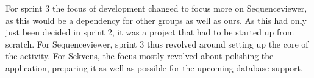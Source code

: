 For sprint 3 the focus of development changed to focus more on Sequenceviewer, as this would be a dependency for other groups as well as ours. As this had only just been decided in sprint 2, it was a project that had to be started up from scratch. For Sequenceviewer, sprint 3 thus revolved around setting up the core of the activity. For Sekvens, the focus mostly revolved about polishing the application, preparing it as well as possible for the upcoming database support.